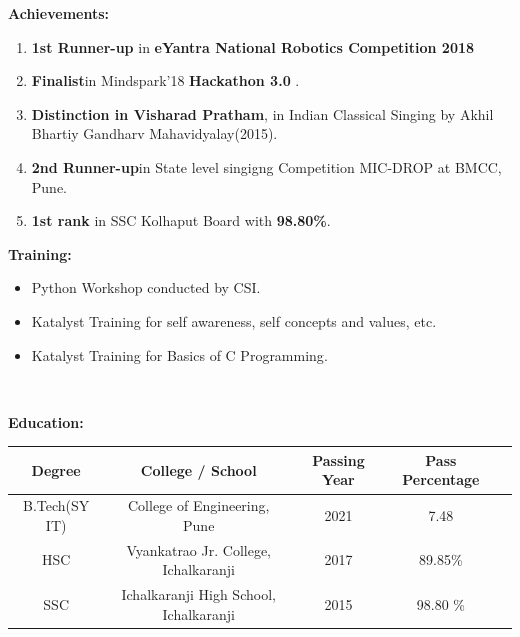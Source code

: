 \documentclass[a4paper,11pt]{article}
\begin{document}
\begin{minipage}[t]{0.5\textwidth}
			\raggedright\smallskip
			\begin{LARGE}
				\textbf{Achievements:}\medskip%
				{\small
					\begin{enumerate}
						\item \textbf{1st Runner-up} in \textbf{eYantra National Robotics Competition 2018}
						\item \textbf{Finalist}in Mindspark'18 \textbf{Hackathon 3.0} .
						\item \textbf{Distinction in Visharad Pratham}, in Indian Classical Singing by Akhil Bhartiy Gandharv Mahavidyalay(2015).
						\item \textbf{2nd Runner-up}in State level singigng Competition MIC-DROP at BMCC, Pune.
						\item \textbf{1st rank} in SSC Kolhaput Board with \textbf{98.80\%}.
					\end{enumerate}
				}
			\end{LARGE}
			\vspace{0.65cm}

\begin{Large}
				\textbf{Training:}\medskip%
				{\small
					\begin{itemize}
						\item {Python Workshop conducted by CSI.}
						\item {Katalyst Training for self awareness, self concepts and values, etc.}
						\item {Katalyst Training for Basics of C Programming}.
					\end{itemize}
				}
			\end{Large}

			\
\end{minipage}%

\begin{Large}
	\textbf{Education:}\medskip%
\end{Large}

 \begin{large}
			\bigbreak
			\begin{tabular}{|c |c |c |c |c |}
				\hline
				Degree & College / School  & Passing Year & Pass Percentage \\
				\hline
				B.Tech(SY IT)& College of Engineering, Pune& 2021 & 7.48\\
				\hline
				HSC &Vyankatrao Jr. College, Ichalkaranji & 2017 & 89.85\% \\
				\hline
				SSC & Ichalkaranji High School, Ichalkaranji & 2015 & 98.80 \%\\
				\hline
				 
			\end{tabular}
\end{large}
\vspace{0.5cm}
\end{document}
